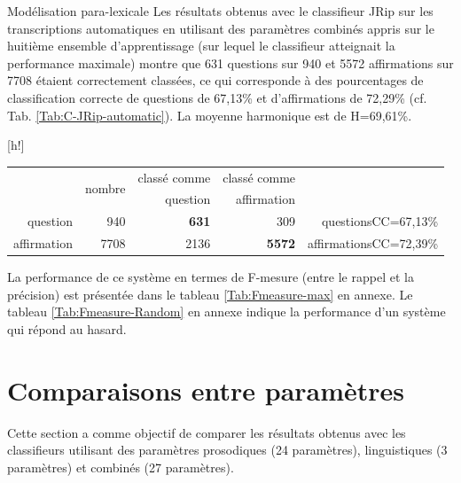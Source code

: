 \documentclass{style/these}
\makeatletter
\renewcommand\familydefault{ptm}
\renewenvironment{table}%
{ \renewcommand{\familydefault}{ptm}\selectfont
  \@float{table}}
  {\end@float}
\makeatother
\begin{document}
\begin{part}{Modélisation para-lexicale}
Les résultats obtenus avec le classifieur JRip sur les transcriptions automatiques  en utilisant des paramètres combinés appris sur le huitième ensemble d'apprentissage (sur lequel le classifieur atteignait la performance maximale) montre que 631 questions sur 940 et 5572 affirmations sur 7708 étaient correctement classées, ce qui corresponde à des pourcentages de classification correcte de questions de 67,13\% et d'affirmations de 72,29\% (cf. Tab. \ref{Tab:C-JRip-automatic}). 
La moyenne harmonique est de H=69,61\%.

\begin{table}[h!]
\centering
\begin{tabular}{|r|r|r|r|r}
\cline{2-4}
\multicolumn{1}{c|}{} 	& \multirow{2}{*}{nombre}	& classé comme 		& classé comme 	& 				\\ 
\multicolumn{1}{c|}{} 	& 				& question 		& affirmation 	& 				\\ \cline{1-4} 
question		&   940				& \textbf{631}  	& 309		& questionsCC=67,13\%		\\ \cline{1-4} 
affirmation		&  7708				& 2136			& \textbf{5572} & affirmationsCC=72,39\%	\\ \cline{1-4}	
\end{tabular}
\caption{Matrice de confusion question/affirmation obtenue avec le classifieur JRip  sur les paramètres combinés extraits des transcriptions automatiques}
\label{Tab:C-JRip-automatic}
\end{table}

La performance de ce système en termes de F-mesure (entre le rappel et la précision) est présentée dans le tableau \ref{Tab:Fmeasure-max} en annexe. 
Le tableau \ref{Tab:Fmeasure-Random} en annexe indique la performance d'un système qui répond au hasard.

\section{Comparaisons entre paramètres}
\label{sec:comp}
\renewcommand{\rightmark}{Comparaisons entre paramètres}

Cette section a comme objectif de comparer les résultats obtenus avec les classifieurs utilisant des paramètres prosodiques (24 paramètres), linguistiques (3 paramètres) et combinés (27 paramètres). 


\end{part}
\end{document}
